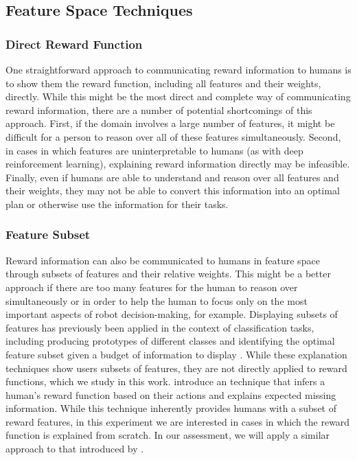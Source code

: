 \documentclass[letterpaper]{article} %
\begin{document}
\subsection{Feature Space Techniques}

\subsubsection{Direct Reward Function}
One straightforward approach to communicating reward information to humans is to show them the reward function, including all features and their weights, directly. While this might be the most direct and complete way of communicating reward information, there are a number of potential shortcomings of this approach. First, if the domain involves a large number of features, it might be difficult for a person to reason over all of these features simultaneously. Second, in cases in which features are uninterpretable to humans (as with deep reinforcement learning), explaining reward information directly may be infeasible. Finally, even if humans are able to understand and reason over all features and their weights, they may not be able to convert this information into an optimal plan or otherwise use the information for their tasks.


\subsubsection{Feature Subset}

Reward information can also be communicated to humans in feature space through subsets of features and their relative weights. This might be a better approach if there are too many features for the human to reason over simultaneously or in order to help the human to focus only on the most important aspects of robot decision-making, for example. Displaying subsets of features has previously been applied in the context of classification tasks, including producing prototypes of different classes \cite{kim2014bayesian} and identifying the optimal feature subset given a budget of information to display \cite{ribeiro2016should}. While these explanation techniques show users subsets of features, they are not directly applied to reward functions, which we study in this work. \citet{tabrez2019explanation} introduce an technique that infers a human's reward function based on their actions and explains expected missing information. While this technique inherently provides humans with a subset of reward features, in this experiment we are interested in cases in which the reward function is explained from scratch. In our assessment, we will apply a similar approach to that introduced by \citet{ribeiro2016should}.
\end{document}

